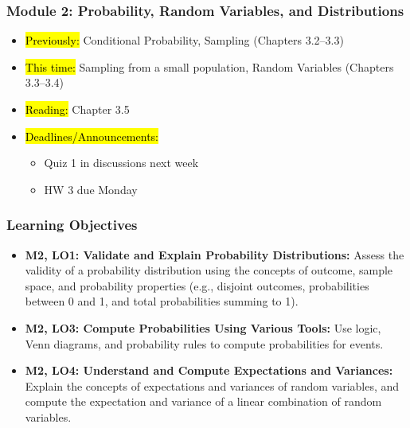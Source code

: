 
\begin{frame}
    \frametitle{Module 2: Probability, Random Variables, and Distributions}
    \begin{itemize}
        \item \hl{Previously: }Conditional Probability, Sampling (Chapters 3.2--3.3)
        \item \hl{This time: }Sampling from a small population, Random Variables (Chapters 3.3--3.4)
        \item \hl{Reading: }Chapter 3.5
        \item \hl{Deadlines/Announcements: }
        \begin{itemize}
            \item Quiz 1 in discussions next week
            \item HW 3 due Monday
        \end{itemize}
    \end{itemize}

\end{frame}

\begin{frame}
    \frametitle{Learning Objectives}
    \begin{itemize}
        \item \textbf{M2, LO1: Validate and Explain Probability Distributions:} Assess the validity of a probability distribution using the concepts of outcome, sample space, and probability properties (e.g., disjoint outcomes, probabilities between 0 and 1, and total probabilities summing to 1).
        \item \textbf{M2, LO3: Compute Probabilities Using Various Tools:} Use logic, Venn diagrams, and probability rules to compute probabilities for events.
        \item \textbf{M2, LO4: Understand and Compute Expectations and Variances:} Explain the concepts of expectations and variances of random variables, and compute the expectation and variance of a linear combination of random variables.
    \end{itemize}
\end{frame}
